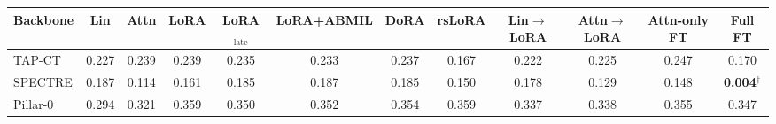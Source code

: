 \setlength{\tabcolsep}{3pt}
\begin{tabular}{lccccccccccc}
\toprule
Backbone & Lin & Attn & LoRA & LoRA$_{\text{late}}$ & LoRA+ABMIL & DoRA & rsLoRA & Lin$\to$LoRA & Attn$\to$LoRA & Attn-only FT & Full FT \\
\midrule
TAP-CT & 0.227 & 0.239 & 0.239 & 0.235 & 0.233 & 0.237 & 0.167 & 0.222 & 0.225 & 0.247 & 0.170 \\
SPECTRE & 0.187 & 0.114 & 0.161 & 0.185 & 0.187 & 0.185 & 0.150 & 0.178 & 0.129 & 0.148 & \textbf{0.004}$^{\dagger}$ \\
Pillar-0 & 0.294 & 0.321 & 0.359 & 0.350 & 0.352 & 0.354 & 0.359 & 0.337 & 0.338 & 0.355 & 0.347 \\
\bottomrule
\end{tabular}
